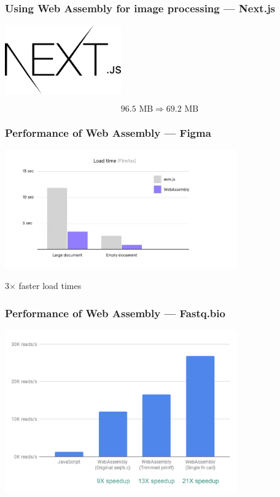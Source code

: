 \documentclass{beamer}
\begin{document}
\begin{frame}
    \frametitle{Using Web Assembly for image processing — Next.js}
    \begin{center}
        \includegraphics[width=5cm]{nextjs.png}

    \end{center}

    $$
        96.5 \text{ MB} \Rightarrow 69.2 \text{ MB}
    $$
\end{frame}

\begin{frame}
    \frametitle{Performance of Web Assembly — Figma}
    \begin{center}
        \includegraphics[width=10cm]{figma_perf.png}

    \end{center}

    \begin{center}
        3$\times$ faster load times
    \end{center}
\end{frame}

\begin{frame}
    \frametitle{Performance of Web Assembly — Fastq.bio}
    \begin{center}
        \includegraphics[width=10cm]{fastq.png}

    \end{center}
\end{frame}
\end{document}
